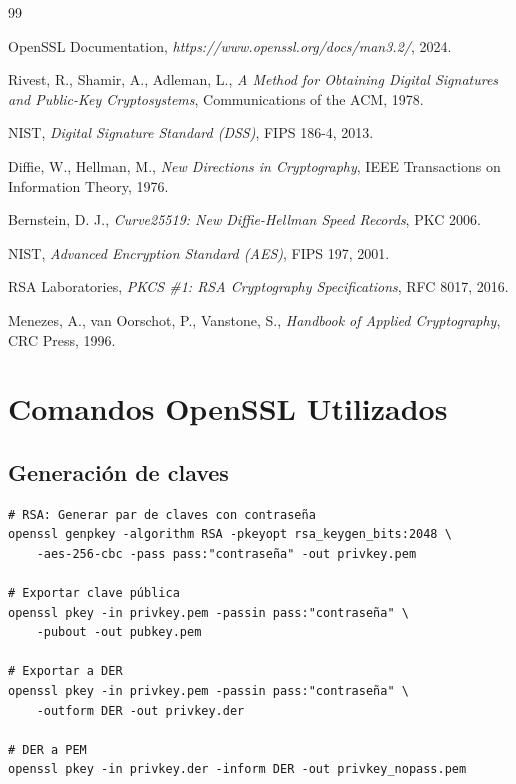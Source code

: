 \documentclass[12pt,a4paper]{report}
\begin{document}
\begin{thebibliography}{99}

 OpenSSL Documentation, \textit{https://www.openssl.org/docs/man3.2/}, 2024.

 Rivest, R., Shamir, A., Adleman, L., \textit{A Method for Obtaining Digital Signatures and Public-Key Cryptosystems}, Communications of the ACM, 1978.

 NIST, \textit{Digital Signature Standard (DSS)}, FIPS 186-4, 2013.

 Diffie, W., Hellman, M., \textit{New Directions in Cryptography}, IEEE Transactions on Information Theory, 1976.

 Bernstein, D. J., \textit{Curve25519: New Diffie-Hellman Speed Records}, PKC 2006.

 NIST, \textit{Advanced Encryption Standard (AES)}, FIPS 197, 2001.

 RSA Laboratories, \textit{PKCS \#1: RSA Cryptography Specifications}, RFC 8017, 2016.

 Menezes, A., van Oorschot, P., Vanstone, S., \textit{Handbook of Applied Cryptography}, CRC Press, 1996.

\end{thebibliography}


\appendix

\chapter{Comandos OpenSSL Utilizados}

\section{Generación de claves}

\begin{lstlisting}[caption=Comandos para generación de claves]
# RSA: Generar par de claves con contraseña
openssl genpkey -algorithm RSA -pkeyopt rsa_keygen_bits:2048 \
    -aes-256-cbc -pass pass:"contraseña" -out privkey.pem

# Exportar clave pública
openssl pkey -in privkey.pem -passin pass:"contraseña" \
    -pubout -out pubkey.pem

# Exportar a DER
openssl pkey -in privkey.pem -passin pass:"contraseña" \
    -outform DER -out privkey.der

# DER a PEM
openssl pkey -in privkey.der -inform DER -out privkey_nopass.pem
\end{lstlisting}
\end{document}
